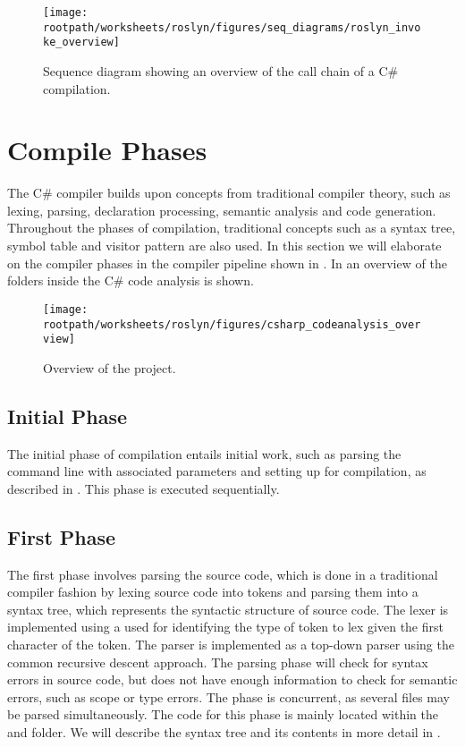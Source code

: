 \begin{sidewaysfigure}[htbp]
\centering
 \texttt{[image: \\rootpath/worksheets/roslyn/figures/seq\_diagrams/roslyn\_invoke\_overview]} 
 \caption{Sequence diagram showing an overview of the call chain of a C\# compilation.}
\label{fig:roslyn_invoke_overview}
\end{sidewaysfigure}

\section{Compile Phases}\label{sec:compile_phases}
The C\# compiler builds upon concepts from traditional compiler theory, such as lexing, parsing, declaration processing, semantic analysis and code generation\cite{sebestaProLang}\cite{fischer2009crafting}. Throughout the phases of compilation, traditional concepts such as a syntax tree, symbol table and visitor pattern\cite[p. 366]{gamma1994design} are also used. In this section we will elaborate on the compiler phases in the compiler pipeline shown in . In  an overview of the folders inside the C\# code analysis is shown.

\begin{figure}[htbp]
\centering
 \texttt{[image: \\rootpath/worksheets/roslyn/figures/csharp\_codeanalysis\_overview]} 
 \caption{Overview of the  project.}
\label{fig:roslyn_csharpanalysis_overview}
\end{figure}

\subsection{Initial Phase}
The initial phase of compilation entails initial work, such as parsing the command line with associated parameters and setting up for compilation, as described in . This phase is executed sequentially\cite{sadovRoslynPerf}.

\subsection{First Phase}
\label{subsec:roslyn_first_phase}
The first phase involves parsing the source code, which is done in a traditional compiler fashion by lexing source code into tokens and parsing them into a syntax tree, which represents the syntactic structure of source code. The lexer is implemented using a  used for identifying the type of token to lex given the first character of the token. The parser is implemented as a top-down parser using the common recursive descent approach. The parsing phase will check for syntax errors in source code, but does not have enough information to check for semantic errors, such as scope or type errors. The phase is concurrent, as several files may be parsed simultaneously\cite{sadovRoslynPerf}. The code for this phase is mainly located within the  and  folder. We will describe the syntax tree and its contents in more detail in .

